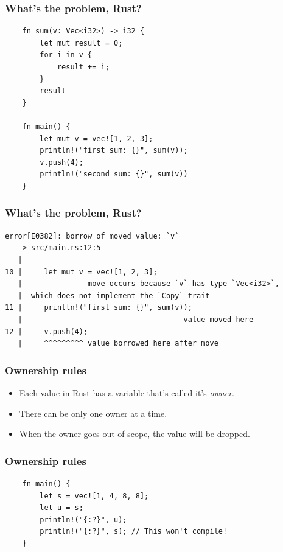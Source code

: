 \documentclass[aspectratio=1610,t]{beamer}
\begin{document}

\begin{frame}[fragile]
\frametitle{What's the problem, Rust?}
\begin{verbatim}
    fn sum(v: Vec<i32>) -> i32 {
        let mut result = 0;
        for i in v {
            result += i;
        }
        result
    }

    fn main() {
        let mut v = vec![1, 2, 3];
        println!("first sum: {}", sum(v));
        v.push(4);
        println!("second sum: {}", sum(v))
    }
\end{verbatim}
\end{frame}


\begin{frame}[fragile]
\frametitle{What's the problem, Rust?}
\begin{verbatim}
error[E0382]: borrow of moved value: `v`
  --> src/main.rs:12:5
   |
10 |     let mut v = vec![1, 2, 3];
   |         ----- move occurs because `v` has type `Vec<i32>`,
   |  which does not implement the `Copy` trait
11 |     println!("first sum: {}", sum(v));
   |                                   - value moved here
12 |     v.push(4);
   |     ^^^^^^^^^ value borrowed here after move
\end{verbatim}
\end{frame}


\begin{frame}[fragile]
\frametitle{Ownership rules}
\begin{itemize}
    \item Each value in Rust has a variable that's called it's \textit{owner}.
    \item There can be only one owner at a time.
    \item When the owner goes out of scope, the value will be dropped.
\end{itemize}
\end{frame}


\begin{frame}[fragile]
\frametitle{Ownership rules}
\begin{verbatim}
    fn main() {
        let s = vec![1, 4, 8, 8];
        let u = s;
        println!("{:?}", u);
        println!("{:?}", s); // This won't compile!
    }
\end{verbatim}
\end{frame}
\end{document}
